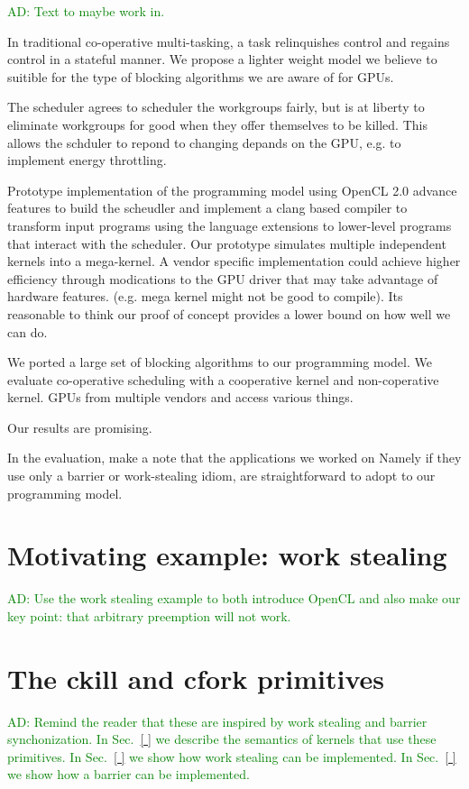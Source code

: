 \documentclass[nocopyrightspace]{sigplanconf-pldi16}
\newcommand{\ADComment}[1]{\textcolor{green}{AD: #1}}
\newcommand{\mysec}{Sec.~}
\begin{document}
\ADComment{Text to maybe work in.}

In traditional co-operative multi-tasking, a task relinquishes control
and regains control in a stateful manner. We propose a lighter weight
model we believe to suitible for the type of blocking algorithms we
are aware of for GPUs.

The scheduler agrees to scheduler the workgroups fairly, but is at
liberty to eliminate workgroups for good when they offer themselves
to be killed. This allows the schduler to repond to changing depands
on the GPU, e.g. to implement energy throttling.

Prototype implementation of the programming model using OpenCL 2.0
advance features to build the scheudler and implement a clang based
compiler to transform input programs using the language extensions to
lower-level programs that interact with the scheduler. Our prototype
simulates multiple independent kernels into a mega-kernel. A vendor
specific implementation could achieve higher efficiency through
modications to the GPU driver that may take advantage of hardware
features. (e.g. mega kernel might not be good to compile). Its
reasonable to think our proof of concept provides a lower bound on how
well we can do.

We ported a large set of blocking algorithms to our programming
model. We evaluate co-operative scheduling with a cooperative kernel
and non-coperative kernel. GPUs from multiple vendors and access
various things.

Our results are promising.

In the evaluation, make a note that the applications we worked on
Namely if they use only a barrier or work-stealing idiom, are
straightforward to adopt to our programming model.



\section{Motivating example: work stealing}

\ADComment{Use the work stealing example to both introduce OpenCL and
  also make our key point: that arbitrary preemption will not work.}


\section{The ckill and cfork primitives}

\ADComment{Remind the reader that these are inspired by work stealing
  and barrier synchonization.  In \mysec\ref{ } we describe the
  semantics of kernels that use these primitives.  In \mysec\ref{ } we
  show how work stealing can be implemented.  In \mysec\ref{ } we show
  how a barrier can be implemented.}
\end{document}
